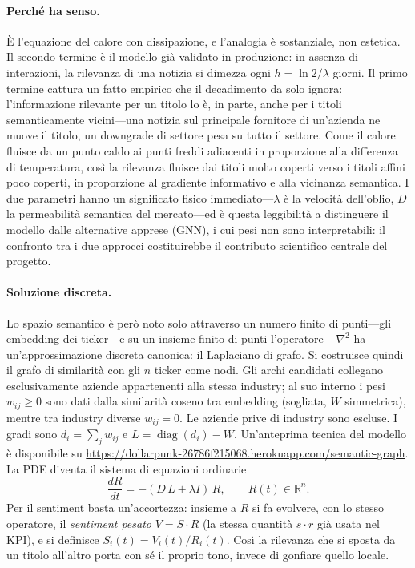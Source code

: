 \paragraph{Perché ha senso.}
È l'equazione del calore con dissipazione, e l'analogia è sostanziale, non estetica.
Il secondo termine è il modello già validato in produzione: in assenza di interazioni, la rilevanza di una notizia si dimezza ogni $h = \ln 2/\lambda$ giorni.
Il primo termine cattura un fatto empirico che il decadimento da solo ignora: l'informazione rilevante per un titolo lo è, in parte, anche per i titoli semanticamente vicini---una notizia sul principale fornitore di un'azienda ne muove il titolo, un downgrade di settore pesa su tutto il settore.
Come il calore fluisce da un punto caldo ai punti freddi adiacenti in proporzione alla differenza di temperatura, così la rilevanza fluisce dai titoli molto coperti verso i titoli affini poco coperti, in proporzione al gradiente informativo e alla vicinanza semantica.
I due parametri hanno un significato fisico immediato---$\lambda$ è la velocità dell'oblio, $D$ la permeabilità semantica del mercato---ed è questa leggibilità a distinguere il modello dalle alternative apprese (GNN), i cui pesi non sono interpretabili: il confronto tra i due approcci costituirebbe il contributo scientifico centrale del progetto.

\paragraph{Soluzione discreta.}
Lo spazio semantico è però noto solo attraverso un numero finito di punti---gli embedding dei ticker---e su un insieme finito di punti l'operatore $-\nabla^2$ ha un'approssimazione discreta canonica: il Laplaciano di grafo.
Si costruisce quindi il grafo di similarità con gli $n$ ticker come nodi. Gli archi candidati collegano esclusivamente aziende appartenenti alla stessa industry; al suo interno i pesi $w_{ij} \geq 0$ sono dati dalla similarità coseno tra embedding (sogliata, $W$ simmetrica), mentre tra industry diverse $w_{ij}=0$. Le aziende prive di industry sono escluse. I gradi sono $d_i = \sum_j w_{ij}$ e $L = \operatorname{diag}(d_i) - W$. Un'anteprima tecnica del modello è disponibile su \url{https://dollarpunk-26786f215068.herokuapp.com/semantic-graph}.
La PDE diventa il sistema di equazioni ordinarie
\[
\frac{dR}{dt} = -(D\,L + \lambda I)\, R, \qquad R(t) \in \mathbb{R}^n.
\]
Per il sentiment basta un'accortezza: insieme a $R$ si fa evolvere, con lo stesso operatore, il \emph{sentiment pesato} $V = S \cdot R$ (la stessa quantità $s \cdot r$ già usata nel KPI), e si definisce $S_i(t) = V_i(t)/R_i(t)$.
Così la rilevanza che si sposta da un titolo all'altro porta con sé il proprio tono, invece di gonfiare quello locale.


